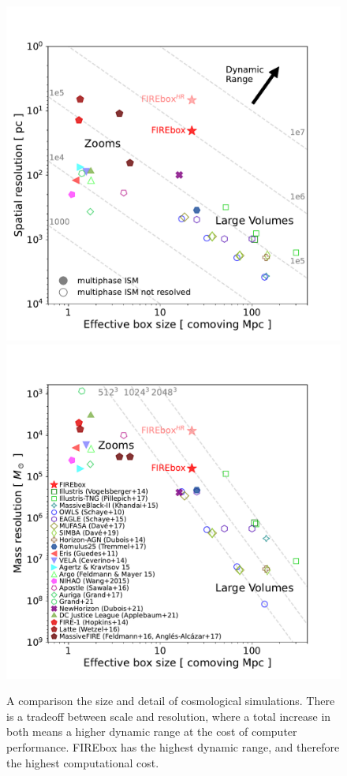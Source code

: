 \begin{figure}
    \includegraphics[width=\textwidth/2]{figs/feldmann/fig2a}
    \includegraphics[width=\textwidth/2]{figs/feldmann/fig2b}
    
    \caption{A comparison the size and detail of cosmological simulations. There is a tradeoff between scale and resolution, where a total increase in both means a higher dynamic range at the cost of computer performance. FIREbox has the highest dynamic range, and therefore the highest computational cost.}

    \label{fig:feldmann-dynrange}
\end{figure}